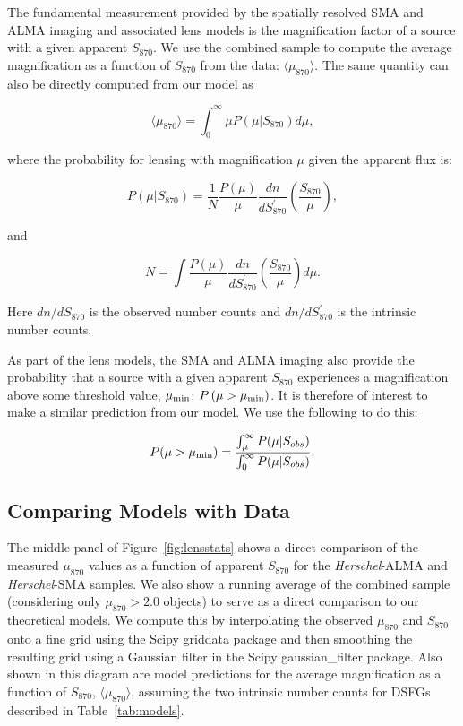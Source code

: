 \documentclass[iop]{emulateapj}
\begin{document}
The fundamental measurement provided by the spatially resolved SMA and ALMA
imaging and associated lens models is the magnification factor of a source with
a given apparent $S_{870}$.  We use the combined sample to compute the average
magnification as a function of $S_{870}$ from the data:
$\langle\mu_{870}\rangle$.  The same quantity can also be directly computed
from our model as 

\begin{equation}
    \langle\mu_{870}\rangle = \int_0^\infty \mu P(\mu|S_{870})  d\mu,
 \end{equation}

\noindent where the probability for lensing with magnification $\mu$ given the
apparent flux is:

\begin{equation}
    P(\mu|S_{870}) = \frac{1}{N} \frac{P(\mu)}{\mu} \frac{dn}{dS_{870}^\prime}
\left(\frac{S_{870}}{\mu}\right),
\end{equation} 

\noindent and 

\begin{equation}
    N = \int \frac{P(\mu)}{\mu} \frac{dn}{dS_{870}^\prime}
    \left(\frac{S_{870}}{\mu}\right)d\mu.
\end{equation}

\noindent Here $ dn/dS_{870}$ is the observed number counts and
$dn/dS_{870}^\prime$ is the intrinsic number counts.

As part of the lens models, the SMA and ALMA imaging also provide the
probability that a source with a given apparent $S_{870}$ experiences a
magnification above some threshold value, $\mu_{\rm min}$: $P\,(\mu > \mu_{\rm
min})$.  It is therefore of interest to make a similar prediction from our
model.  We use the following to do this:

\begin{equation}
    P(\mu>\mu_{\rm min}) = \frac{\int_\mu^\infty P(\mu|S_{obs})}{\int_0^\infty
    P(\mu|S_{obs})}.
\end{equation}

\subsection{Comparing Models with Data}

The middle panel of Figure~\ref{fig:lensstats} shows a direct comparison of the
measured $\mu_{870}$ values as a function of apparent $S_{870}$ for the {\it
Herschel}-ALMA and {\it Herschel}-SMA samples.  We also show a running average
of the combined sample (considering only $\mu_{870} > 2.0$ objects) to serve as
a direct comparison to our theoretical models.  We compute this by
interpolating the observed $\mu_{870}$ and $S_{870}$ onto a fine grid using the
{\sc Scipy} {\sc griddata} package and then smoothing the resulting grid using
a Gaussian filter in the Scipy {\sc gaussian\_filter} package.
Also shown in this diagram are model predictions for the average magnification
as a function of $S_{870}$, $\langle\mu_{870}\rangle$, assuming the two
intrinsic number counts for DSFGs described in Table~\ref{tab:models}.  
\end{document}
